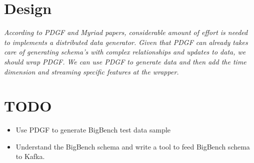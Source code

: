 \documentclass{thesis}
\begin{document}
\section{Design}

\emph{According to PDGF and Myriad papers, considerable amount of effort is needed to implements a distributed data generator. Given that PDGF can already takes care of generating schema's with complex relationships and updates to data, we should wrap PDGF. We can use PDGF to generate data and then add the time dimension and streaming specific features at the wrapper.}

\section{TODO}

\begin{itemize}
	\item Use PDGF to generate BigBench test data sample
	\item Understand the BigBench schema and write a tool to feed BigBench schema to Kafka.
\end{itemize}






\end{document}
